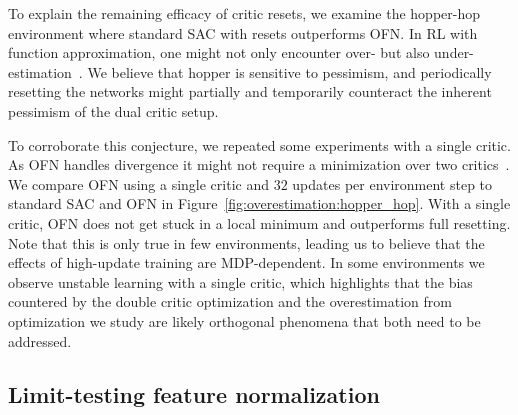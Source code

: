 To explain the remaining efficacy of critic resets, we examine the hopper-hop environment where standard SAC with resets outperforms OFN. 
In RL with function approximation, one might not only encounter over- but also under-estimation~\parencite{wu2020reducing, lan2020maxmin, saglam2021estimation}.
We believe that hopper  is sensitive to pessimism, and periodically resetting the networks might partially and temporarily counteract the inherent pessimism of the dual critic setup.

To corroborate this conjecture, we repeated some experiments with a single critic. As OFN handles divergence it might not require a minimization over two critics~\parencite{fujimoto2018addressing}. We compare OFN using a single critic and $32$ updates per environment step to standard SAC and OFN in Figure~\ref{fig:overestimation:hopper_hop}. With a single critic, OFN does not get stuck in a local minimum and outperforms full resetting. Note that this is only true in few environments, leading us to believe that the effects of high-update training are MDP-dependent.
In some environments we observe unstable learning with a single critic, which highlights that the bias countered by the double critic optimization and the overestimation from optimization we study are likely orthogonal phenomena that both need to be addressed.

\subsection{Limit-testing feature normalization}

